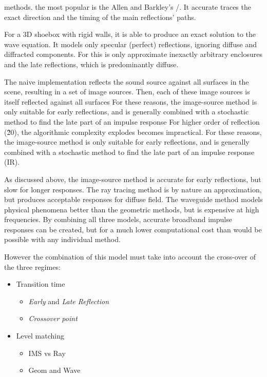  methods.
the most popular is the Allen and Barkley's \ISMf/\cite{Allen1979image}.
It accurate traces the exact direction and the timing of the main reflections' paths.

For a 3D shoebox with rigid walls, it is able to produce an exact solution to the wave equation.
It models only specular (perfect) reflections, ignoring diffuse and diffracted components.
For this is only approximate inexactly arbitrary enclosures and the late reflections, which is predominantly diffuse.

The naive implementation reflects the sound source against all surfaces in the scene, resulting in a set of image sources. Then, each of these image sources is itself reflected against all surfaces
For these reasons, the image-source method is only suitable for early reflections, and is generally combined with a stochastic method to find the late part of an impulse response
For higher order of reflection (\~20), the algorithmic complexity explodes becomes impractical.
For these reasons, the image-source method is only suitable for early reflections, and is generally combined with a stochastic method to find the late part of an impulse response (IR).

As discussed above, the image-source method is accurate for early reflections, but slow for longer responses.
The ray tracing method is by nature an approximation, but produces acceptable responses for diffuse field.
The waveguide method models physical phenomena better than the geometric methods, but is expensive at high frequencies.
By combining all three models, accurate broadband impulse responses can be created,
but for a much lower computational cost than would be possible with any individual method.



However the combination of this model must take into account the cross-over of the three regimes:
\begin{itemize}
    \item Transition time
    \begin{itemize}
        \item \textit{Early} and \textit{Late Reflection}
        \item \textit{Crossover point}
    \end{itemize}
    \item Level matching
    \begin{itemize}
        \item IMS vs Ray
        \item Geom and Wave
    \end{itemize}
\end{itemize}


